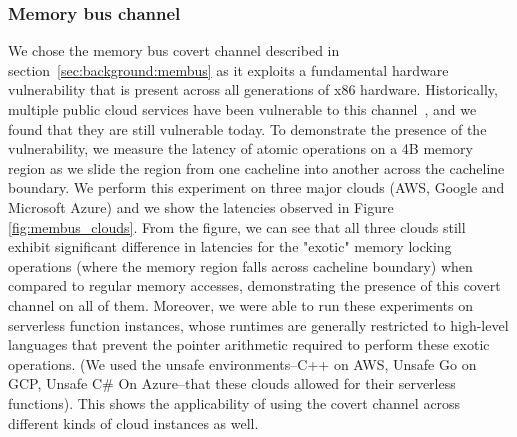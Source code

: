 
\subsubsection{Memory bus channel}
We chose the memory bus covert channel described
in section~\ref{sec:background:membus} as it exploits a fundamental hardware
vulnerability that is present across all generations of x86 hardware.
Historically, multiple public cloud services have been vulnerable to this
channel~\cite{varad191016,zhang2016}, and we found that they are
still vulnerable today. To demonstrate the presence of the vulnerability, 
we measure the latency of atomic operations on a 4B memory region as 
we slide the region from one cacheline into another across the cacheline 
boundary. We perform this experiment on three major clouds (AWS, Google 
and Microsoft Azure) and we show the latencies observed in Figure 
\ref{fig:membus_clouds}. From the figure, we can see that all three clouds 
still exhibit significant difference in latencies for the "exotic" memory locking
operations (where the memory region falls across cacheline boundary) when compared 
to regular memory accesses, demonstrating the presence of this covert channel 
on all of them. Moreover, we were able to run these experiments on 
serverless function instances, whose runtimes are generally restricted to 
high-level languages that
prevent the pointer arithmetic required to perform these exotic operations.  
(We used the unsafe environments--C++ on AWS, Unsafe Go
on GCP, Unsafe C\# On Azure--that these clouds allowed for their serverless functions). 
This shows the applicability of using the covert channel across 
different kinds of cloud instances as well.


